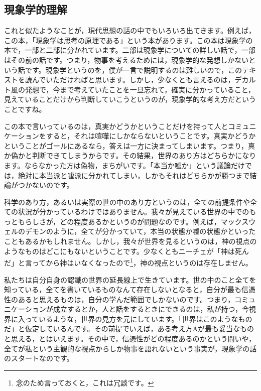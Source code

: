 \documentclass{ltjsbook}
\begin{document}
\subsection{現象学的理解}
これと似たようなことが，現代思想の話の中でもいろいろ出てきます。例えば，この本，「現象学は思考の原理である」という本\parencite{TakedaSeiji}があります。この本は現象学の本で，一部と二部に分かれています。二部は現象学についての詳しい話で，一部はその前の話です。つまり，物事を考えるためには，現象学的な発想しかないという話です。現象学というのを，僕が一言で説明するのは難しいので，このテキストを読んでいただければと思います。しかし，少なくとも言えるのは，デカルト風の発想で，今まで考えていたことを一旦忘れて，確実に分かっていること，見えていることだけから判断していこうというのが，現象学的な考え方だということですね。

この本で言いっているのは，真実かどうかということだけを持って人とコミュニケーションをすると，それは喧嘩にしかならないということです。真実かどうかということがゴールにあるなら，答えは一方に決まってしまいます。つまり，真か偽かと判断できてしまうからです。その結果，世界のあり方はどちらかになります。ならなかった方は偽物，まちがいです。「本当か嘘か」という議論だけでは，絶対に本当派と嘘派に分かれてしまい，しかもそれはどちらかが勝つまで結論がつかないのです。

科学のあり方，あるいは実際の世の中のあり方というのは，全ての前提条件や全ての状況が分かっているわけではありません。我々が見えている世界の中でのもっともらしさが，どの程度あるかというのが問題なのです。例えば，マックスウェルのデモンのように，全てが分かっていて，本当の状態か嘘の状態かといったこともあるかもしれません。しかし，我々が世界を見るというのは，神の視点のようなものはどこにもないということです。少なくともニーチェが「神は死んだ」と言ってから神はいなくなったので\footnote{念のため言っておくと，これは冗談です。}，神の視点というのは存在しません。

私たちは自分自身の認識の世界の延長線上で生きています。世の中のこと全てを知っている，全てを書いているものなんて存在しないとなると，自分が最も信憑性のあると思えるものは，自分の学んだ範囲でしかないのです。つまり，コミュニケーションが成立するとか，人と話をするときにできるのは，私が持つ，今視界に入っているような，世界の見方を元にしています。「世界はこのようなものだ」と仮定しているんです。その前提でいえば，ある考え方Aが最も妥当なものと思える，とはいえます。その中で，信憑性がどの程度あるのかという問いや，全てが私という主観的な視点からしか物事を語れないという事実が，現象学の話のスタートなのです。
\end{document}
